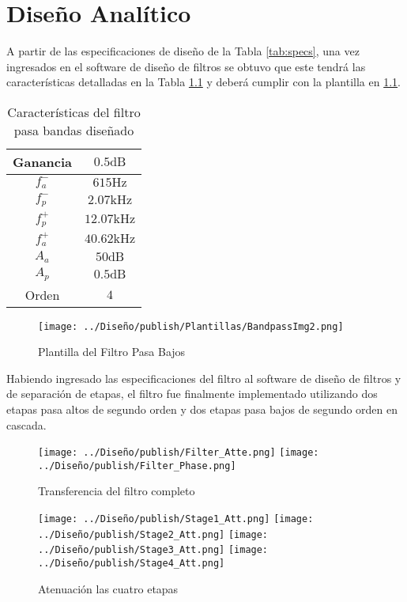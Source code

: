 \chapter{Diseño Analítico}

A partir de las especificaciones de diseño de la Tabla \ref{tab:specs}, una vez ingresados en el software de diseño de filtros se obtuvo que este tendrá las características detalladas en la Tabla \ref{tab:frecuencias} y deberá cumplir con la plantilla en \ref{fig:plantilla}.

\begin{table}[ht]
\begin{center}
\begin{tabular}{||c|c||}
\hline
Ganancia	&	$0.5 \si{\deci\bel}$	\\
\hline	
$f_a^-$		&	$615 \si{\hertz}$	\\
\hline	
$f_p^-$		&	$2.07 \si{\kilo\hertz}$	\\
\hline	
$f_p^+$	&	$12.07 \si{\kilo\hertz}$	\\
\hline	
$f_a^+$	&	$40.62 \si{\kilo\hertz}$	\\
\hline	
$A_a$		&	$50 \si{\deci\bel}$	\\
\hline	
$A_p$		&	$0.5 \si{\deci\bel}$	\\
\hline	
Orden		&	$4$	\\
\hline	
\end{tabular}
\caption{Características del filtro pasa bandas diseñado}
\label{tab:frecuencias}
\end{center}
\end{table}

\begin{figure}[ht]
\begin{center}
\texttt{[image: ../Diseño/publish/Plantillas/BandpassImg2.png]}
\caption{Plantilla del Filtro Pasa Bajos}
\label{fig:plantilla}
\end{center}
\end{figure}

Habiendo ingresado las especificaciones del filtro al software de diseño de filtros y de separación de etapas, el filtro fue finalmente implementado utilizando dos etapas pasa altos de segundo orden y dos etapas pasa bajos de segundo orden en cascada.

\begin{figure}[ht]
\begin{center}
\texttt{[image: ../Diseño/publish/Filter\_Atte.png]}
\texttt{[image: ../Diseño/publish/Filter\_Phase.png]}
\caption{Transferencia del filtro completo}
\end{center}
\end{figure}

\begin{figure}[ht]
\begin{center}
\texttt{[image: ../Diseño/publish/Stage1\_Att.png]}
\texttt{[image: ../Diseño/publish/Stage2\_Att.png]}
\texttt{[image: ../Diseño/publish/Stage3\_Att.png]}
\texttt{[image: ../Diseño/publish/Stage4\_Att.png]}
\caption{Atenuación las cuatro etapas}
\end{center}
\end{figure}